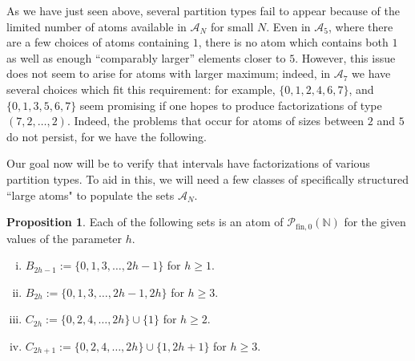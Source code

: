 \documentclass{report}
\newcommand{\NN}{\mathbb{N}}
\renewcommand{\P}{\mathcal{P}}
\newcommand{\fin}{\textrm{fin}}
\renewcommand{\:}{\text{:}}
\newcommand{\PN}{{\P_{\fin,0}(\NN)}}
\theoremstyle{definition}
\newtheorem{prop}[defn]{Proposition}
\begin{document}
As we have just seen above, several partition types fail to appear because of the limited number of atoms available in $\mathcal{A}_N$ for small $N$.
Even in $\mathcal{A}_5$, where there are a few choices of atoms containing $1$, there is no atom which contains both $1$ as well as enough ``comparably larger'' elements closer to $5$.
However, this issue does not seem to arise for atoms with larger maximum; indeed, in $\mathcal{A}_7$ we have several choices which fit this requirement: for example, $\{0, 1, 2, 4, 6, 7\}$, and $\{0, 1, 3, 5, 6, 7\}$ seem promising if one hopes to produce factorizations of type $(7,2,\dots, 2)$. 
Indeed, the problems that occur for atoms of sizes between $2$ and $5$ do not persist, for we have the following.

Our goal now will be to verify that intervals have factorizations of various partition types.  
To aid in this, we will need a few classes of specifically structured ``large atoms" to populate the sets $\mathcal{A}_N$.

\begin{prop} \label{prop:2-congruence atoms}
Each of the following sets is an atom of $\PN$ for the given values of the parameter $h$.
\begin{enumerate}[(i)]
\item $B_{2h-1} := \{0,1,3,\dots, 2h-1\}$ for $h\ge 1$.
\item $B_{2h} := \{0,1,3,\dots, 2h-1,2h\}$ for $h \ge 3$.
\item $C_{2h} := \{0,2,4,\dots,2h\}\cup\{1\}$ for $h\ge 2$.
\item $C_{2h+1} := \{0,2,4,\dots, 2h\}\cup\{1,2h+1\}$ for $h\ge 3$.
\end{enumerate}
\end{prop}
\end{document}
